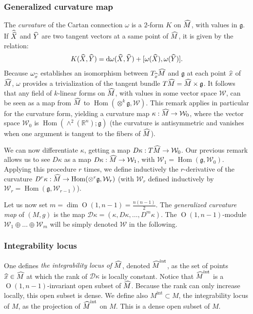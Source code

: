 \documentclass[11pt]{article}
\theoremstyle{definition}
\numberwithin{equation}{section}
\numberwithin{figure}{section}
\numberwithin{table}{section}
\DeclareMathOperator{\Hom}{Hom}
\DeclareMathOperator{\Omp}{O}%
\newcommand{\mint}{{M^{\intl}}}
\newcommand{\hmint}{{{\hat M}^{\intl}}}
\DeclareMathOperator{\intl}{int}
\newcommand*\dk{{\mathcal{D}\kappa}}
\newcommand*\RR{\mathbb{R}}
\newcommand{\lieg}{{\mathfrak{g}}}
\newcommand{\hm}{{\hat{M}}}
\newcommand{\hx}{{\hat{x}}}
\let\oldhat\hat
\renewcommand*\hat[1]{\mathchoice{\widehat{#1}}{\widehat{#1}}{\widehat{#1}}{\oldhat{#1}}}
\newcommand*{\dd}{\mathrm{d}}
\begin{document}
\subsubsection{Generalized curvature map}\label{sec.generalized.curvature}
The \emph{curvature} of the Cartan connection $\omega$ is a $2$-form $K$ on $\hm$, with values in $\lieg$. If $\hat{\widehat{X}}$ and $\hat{Y}$ are two tangent vectors at a same point of $\hm$, it is given by the relation:
\[
K(\hat{X},\hat{Y})=\dd \omega(\hat{X},\hat{Y}) +[\omega(\hat{X}),\omega(\hat{Y})].
\]
Because $\omega_{\hx}$ establishes an isomorphism between $T_{\hx}\hm$ and $\lieg$ at each point $\hx$ of $\hm$, $\omega$ provides a trivialization of the tangent bundle $T\hm=\hm \times \lieg$. It follows that any field of $k$-linear forms on $\hm$, with values in some vector space ${\mathcal W}$, can be seen as a map from $\hm$ to $ \Hom(\otimes^k \lieg,{\mathcal W})$. This remark applies in particular for the curvature form, yielding a curvature map $\kappa: \hm \to {\mathcal W}_0$, where the vector space ${\mathcal W}_0$ is $\Hom(\wedge^2(\RR^n);\lieg)$ (the curvature is antisymmetric and vanishes when one argument is tangent to the fibers of $\hm$).

We can now differentiate $\kappa$, getting a map $D \kappa : T\hm \to {\mathcal W}_0$. Our previous remark allows us to see $D\kappa$ as a map $D \kappa : \hm \to {\mathcal W}_1$, with ${\mathcal W}_1=\Hom(\lieg,{\mathcal W}_0)$. Applying this procedure $r$ times, we define inductively the $r$-derivative of the curvature $D^r \kappa : \hm \to \Hom(\otimes^r \lieg,{\mathcal W}_r)$ (with ${\mathcal W}_r$ defined inductively by ${\mathcal W}_r=\Hom(\lieg, {\mathcal W}_{r-1})$).

Let us now set $m = \dim \Omp(1,n-1)=\frac{n(n-1)}{2}$. The \emph{generalized curvature map} of $(M, g)$ is the map $\dk =(\kappa,D\kappa, \ldots,D^{m}\kappa)$. The $\Omp(1,n-1)$-module ${\mathcal W}_{1} \oplus \ldots \oplus {\mathcal W}_{m}$ will be simply denoted ${\mathcal W}$ in the following.



\subsubsection{Integrability locus}\label{sec.integrability.locus}
One defines \emph{the integrability locus of $\hm$}, denoted $\hmint$, as the set of points $\hx \in \hm$ at which the rank of $ \dk$ is locally constant. Notice that $ \hmint$ is a $\Omp(1,n-1)$-invariant open subset of $\hm$. Because the rank can only increase locally, this open subset is dense. We define also $ \mint \subset M$, the integrability locus of $M$, as the projection of $\hmint$ on $M$. This is a dense open subset of $M$.
\end{document}
